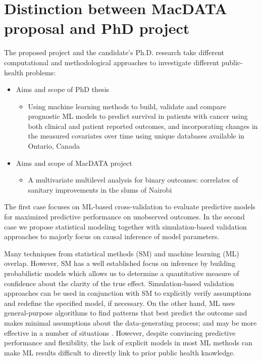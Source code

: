 
\section{Distinction between MacDATA proposal and PhD project}

The proposed project and the candidate's Ph.D. research take different computational and methodological approaches to investigate different public-health problems:

\begin{itemize}
\item Aims and scope of PhD thesis
\begin{itemize}
\item Using machine learning methods to build, validate and compare prognostic ML models to predict survival in patients with cancer using both clinical and patient reported outcomes, and incorporating changes in the measured covariates over time using unique databases available in Ontario, Canada
\end{itemize}
\item Aims and scope of MacDATA project
\begin{itemize}
\item A multivariate multilevel analysis for binary outcomes: correlates of sanitary improvements in the slums of Nairobi
\end{itemize}
\end{itemize}
The first case focuses on ML-based cross-validation to evaluate predictive models for maximized predictive performance on unobserved outcomes. In the second case we propose statistical modeling together with simulation-based validation approaches to majorly focus on causal inference of model parameters.

Many techniques from statistical methods (SM) and machine learning (ML) overlap. However, SM has a well established focus on inference by building probabilistic models which allows us to determine a quantitative measure of confidence about the clarity of the true effect. Simulation-based validation approaches can be used in conjunction with SM to explicitly verify assumptions and redefine the specified model, if necessary. On the other hand, ML uses general-purpose algorithms to find patterns that best predict the outcome and makes minimal assumptions about the data-generating process; and may be more effective in a number of situations \citep{bzdok2018points}. However, despite convincing predictive performance and flexibility, the lack of explicit models in most ML methods can make ML results difficult to directly link to prior public health knowledge.
